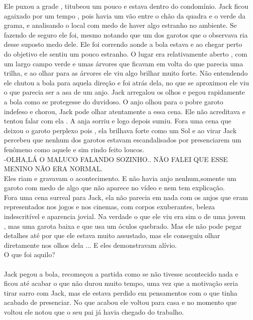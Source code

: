 \documentclass{book}
\begin{document}
 Ele puxou a grade , titubeou um pouco e estava dentro do condomínio. Jack ficou agaixado por um tempo , pois havia um vão entre o chão da quadra e o verde da grama, e analisando o local com medo de haver algo estranho no ambiente. Se fazendo de seguro ele foi, mesmo notando que um dos garotos que o observava ria desse suposto medo dele. Ele foi correndo aonde a bola estava e ao  chegar perto do objetivo ele sentiu um pouco estranho. O lugar era relativamente aberto , com um largo campo verde e umas árvores que ficavam em volta do que parecia uma trilha, e ao olhar para as árvores ele viu algo brilhar muito forte. Não entendendo ele chutou a bola para aquela direção e foi atrás dela, no que se aproximou ele viu o que parecia ser a asa de um anjo. Jack arregalou os olhos e pegou rapidamente a bola como se protegesse do duvidoso. O anjo olhou para o pobre garoto indefeso e chorou, Jack pode olhar atentamente a essa cena. Ele não acreditava e tentou falar com ela . A anja sorriu e logo depois sumiu. Fora uma cena que deixou o garoto perplexo pois , ela brilhava forte como um Sol e ao virar Jack percebeu que nenhum dos garotos estavam escandalisados por presenciarem um fenômeno como aquele e sim rindo feito loucos. \\
 
 -OLHA,LÁ O MALUCO FALANDO SOZINHO.. NÃO FALEI QUE ESSE MENINO NÃO ERA NORMAL.\\
 
 Eles riam e gravavam o acontecimento. E não havia anjo nenhum,somente um garoto com medo de algo que não aparece no vídeo e nem tem explicação.\\
 Fora uma cena surreal para Jack, ela não parecia em nada com os anjos que eram representados nos jogos e nos cinemas, com corpos exuberantes, beleza indescritível e aparencia jovial. Na verdade o que ele viu era sim o de uma jovem , mas uma garota baixa e que usa um óculos quebrado. Mas ele não pode pegar detalhes até por que ele estava muito assustado, mas ele conseguiu olhar diretamente nos olhos dela ... E eles demonstravam alívio. 
 \\O que foi aquilo? \\\\
 Jack pegou a bola, recomeçou a partida como se não tivesse acontecido nada e ficou até acabar o que não durou muito tempo, uma vez que a motivação seria tirar sarro com Jack, mas ele estava perdido em pensamentos com o que tinha acabado de presenciar. No que acabou ele voltou para casa e no momento que voltou ele notou que o seu pai já havia chegado do trabalho.
 
\end{document}
